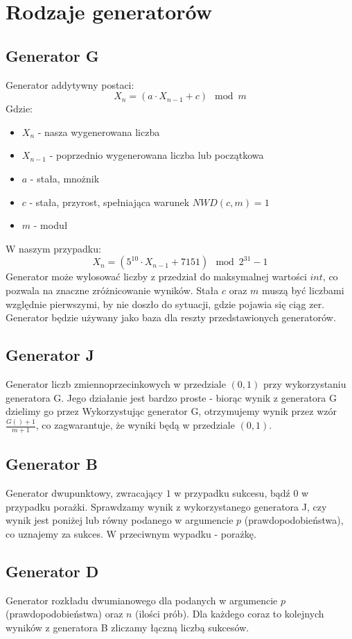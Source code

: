 \documentclass[60pt]{article}
\begin{document}
\newpage

\section{Rodzaje generatorów}
\subsection{Generator G}
Generator addytywny postaci:
$$X_n = (a \cdot X_{n-1} + c) \mod m$$
Gdzie:
\begin{itemize}
    \item $X_n$ - nasza wygenerowana liczba
    \item $X_{n-1}$ - poprzednio wygenerowana liczba lub początkowa
    \item $a$ - stała, mnożnik
    \item $c$ - stała, przyrost, spełniająca warunek $NWD(c,m) = 1$
    \item $m$ - moduł
\end{itemize}
W naszym przypadku:
$$X_n = (5^{10} \cdot X_{n-1} + 7151) \mod 2^{31} - 1$$
Generator może wylosować liczby z przedział do maksymalnej wartości $int$, co pozwala na znaczne zróżnicowanie wyników. Stała $c$ oraz $m$ muszą być liczbami względnie pierwszymi, by nie doszło do sytuacji, gdzie pojawia się ciąg zer.
\\
Generator będzie używany jako baza dla reszty przedstawionych generatorów.


\subsection{Generator J}
Generator liczb zmiennoprzecinkowych w przedziale $(0,1)$ przy wykorzystaniu generatora G. Jego działanie jest bardzo proste - biorąc wynik z generatora G dzielimy go przez 
Wykorzystując generator G, otrzymujemy wynik przez wzór $\frac{G() + 1}{m + 1}$, co zagwarantuje, że wyniki będą w przedziale $(0,1)$.

\subsection{Generator B}
Generator dwupunktowy, zwracający $1$ w przypadku sukcesu, bądź $0$ w przypadku porażki. Sprawdzamy wynik z wykorzystanego generatora J, czy wynik jest poniżej lub równy podanego w argumencie $p$ (prawdopodobieństwa), co uznajemy za sukces. W przeciwnym wypadku - porażkę. 

\subsection{Generator D}
Generator rozkładu dwumianowego dla podanych w argumencie $p$ (prawdopodobieństwa) oraz $n$ (ilości prób). Dla każdego coraz to kolejnych wyników z generatora B zliczamy łączną liczbą sukcesów.
\end{document}
